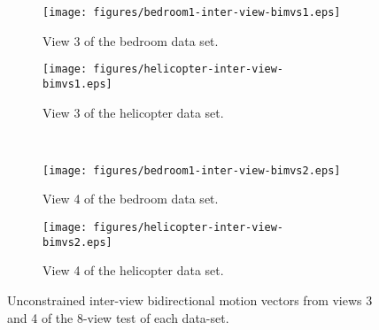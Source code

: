 \documentclass[12pt]{article}
\begin{document}

\begin{figure}
\centering
\begin{subfigure}{.4\textwidth}
\centering
\texttt{[image: figures/bedroom1-inter-view-bimvs1.eps]}
\caption{View 3 of the bedroom data set.}
\end{subfigure} \hspace{.8in}
\begin{subfigure}{.4\textwidth}
\centering
\texttt{[image: figures/helicopter-inter-view-bimvs1.eps]}
\caption{View 3 of the helicopter data set.}
\end{subfigure} \\ \vspace{.3in}
\begin{subfigure}{.4\textwidth}
\centering
\texttt{[image: figures/bedroom1-inter-view-bimvs2.eps]}
\caption{View 4 of the bedroom data set.}
\end{subfigure} \hspace{.8in}
\begin{subfigure}{.4\textwidth}
\centering
\texttt{[image: figures/helicopter-inter-view-bimvs2.eps]}
\caption{View 4 of the helicopter data set.}
\end{subfigure}
\caption{
Unconstrained inter-view bidirectional motion vectors from views 3 and 4  of the
8-view test of each data-set.
}
\end{figure}
\end{document}
